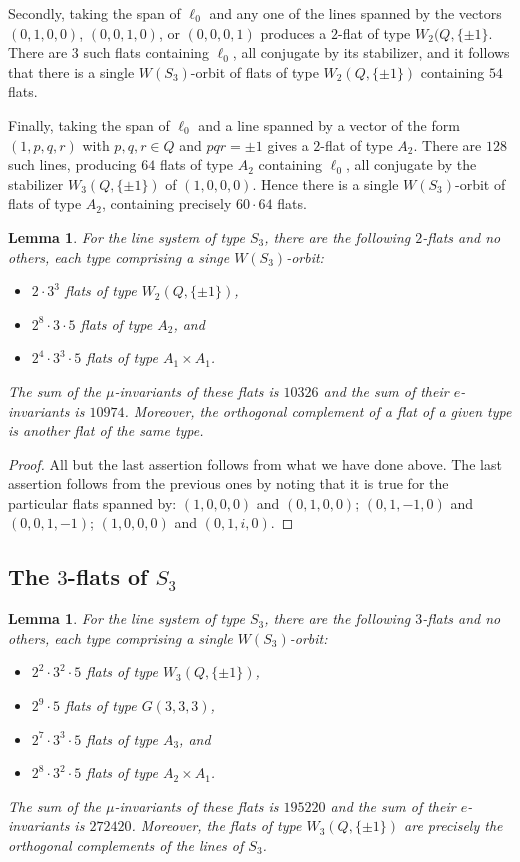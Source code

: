 \documentclass[11pt, reqno]{amsart}
\numberwithin{equation}{section}
\theoremstyle{definition}
\theoremstyle{plain}
\newtheorem{lemma}[theorem]{Lemma}
\begin{document}
Secondly, taking the span of $\ell_0$ and any one of the lines spanned by the vectors $(0,1,0,0)$, $(0,0,1,0)$, or $(0,0,0,1)$ produces a $2$-flat of type $W_2(Q,\{\pm 1\}$. There are $3$ such flats containing $\ell_0$, all conjugate by its stabilizer, and it follows that there is a single $W(S_3)$-orbit of flats of type $W_2(Q,\{\pm 1 \})$ containing $54$ flats.

Finally, taking the span of $\ell_0$ and a line spanned by a vector of the form $(1,p,q,r)$ with $p,q,r \in Q$ and $pqr=\pm 1$ gives a $2$-flat of type $A_2$. There are $128$ such lines, producing $64$ flats of type $A_2$ containing $\ell_0$, all conjugate by the stabilizer $W_3(Q,\{\pm 1\})$ of $(1,0,0,0)$. Hence there is a single $W(S_3)$-orbit of flats of type $A_2$, containing precisely $60 \cdot 64$ flats. 

\begin{lemma}
For the line system of type $S_3$, there are the following $2$-flats and no others, each type comprising a singe $W(S_3)$-orbit:
\begin{itemize}
\item[(a)] $2 \cdot 3^3$ flats of type $W_2(Q,\{\pm1 \})$,
\item[(b)] $2^8 \cdot 3 \cdot 5$ flats of type $A_2$, and
\item[(c)]  $2^4 \cdot 3^3 \cdot 5$ flats of type $A_1 \times A_1$.
\end{itemize}
The sum of the $\mu$-invariants of these flats is $10326$ and the sum of their $e$-invariants is $10974$. Moreover, the orthogonal complement of a flat of a given type is another flat of the same type.
\end{lemma}
\begin{proof}
All but the last assertion follows from what we have done above. The last assertion follows from the previous ones by noting that it is true for the particular flats spanned by: $(1,0,0,0)$ and $(0,1,0,0)$; $(0,1,-1,0)$ and $(0,0,1,-1)$; $(1,0,0,0)$ and $(0,1,i,0)$.
\end{proof}

\subsection{The $3$-flats of $S_3$} 

\begin{lemma}
For the line system of type $S_3$, there are the following $3$-flats and no others, each type comprising a single $W(S_3)$-orbit:
\begin{itemize}
\item[(a)] $2^2 \cdot 3^2 \cdot 5$ flats of type $W_3(Q,\{\pm 1\})$, 
\item[(b)] $2^9 \cdot 5$ flats of type $G(3,3,3)$,
\item[(c)] $2^7 \cdot 3^3 \cdot 5$ flats of type $A_3$, and
\item[(d)] $2^8 \cdot 3^2 \cdot 5$ flats of type $A_2 \times A_1$.
\end{itemize} The sum of the $\mu$-invariants of these flats is $195220$ and the sum of their $e$-invariants is $272420$. Moreover, the flats of type $W_3(Q,\{\pm 1\})$ are precisely the orthogonal complements of the lines of $S_3$.
\end{lemma}
\end{document}
